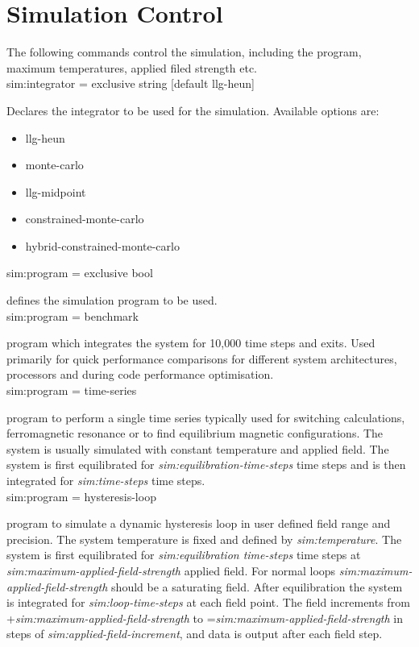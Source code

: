 \section*{Simulation Control}
The following commands control the simulation, including the program, maximum temperatures, applied filed strength etc.\\

{\zicf sim:integrator = exclusive string [default llg-heun]} Declares the integrator to be used for the simulation. Available options are:
\begin{itemize}
  \item[] llg-heun
  \item[] monte-carlo
  \item[] llg-midpoint
  \item[] constrained-monte-carlo
  \item[] hybrid-constrained-monte-carlo
\end{itemize}

{\zicf sim:program = exclusive bool} defines the simulation program to be used.\\

{\zicf sim:program = benchmark} program which integrates the system for 10,000 time steps and exits. Used primarily for quick performance comparisons for different system architectures, processors and during code performance optimisation.\\

{\zicf sim:program = time-series} program to perform a single time series typically used for switching calculations, ferromagnetic resonance or to find equilibrium magnetic configurations. The system is usually simulated with constant temperature and applied field. The system is first equilibrated for \textit{sim:equilibration-time-steps} time steps and is then integrated for \textit{sim:time-steps} time steps.\\

{\zicf sim:program = hysteresis-loop} program to simulate a dynamic hysteresis loop in user defined field range and precision. The system temperature is fixed and defined by \textit{sim:temperature}. The system is first equilibrated for \textit{sim:equilibration time-steps} time steps at \textit{sim:maximum-applied-field-strength} applied field. For normal loops \textit{sim:maximum-applied-field-strength} should be a saturating field. After equilibration the system is integrated for \textit{sim:loop-time-steps} at each field point. The field increments from +\textit{sim:maximum-applied-field-strength} to =\textit{sim:maximum-applied-field-strength} in steps of \textit{sim:applied-field-increment}, and data is output after each field step.\\

